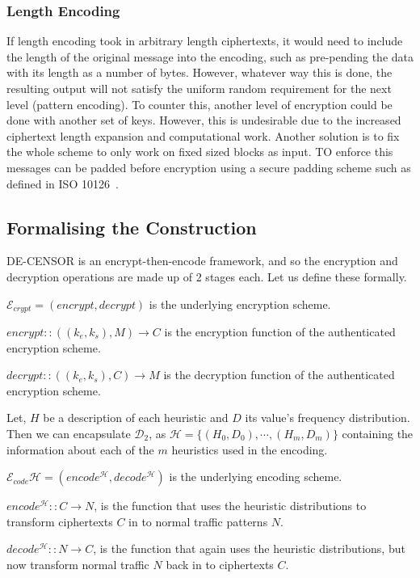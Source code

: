\documentclass[ %
                    author={Samuel Russell},
                supervisor={Prof. Bogdan Warinschi},
                    degree={MEng},
                     title={Innocuous Ciphertexts},
                  subtitle={The DE-CENSOR Scheme},
                      type={Research},
                      year={2018} ]{dissertation}
\begin{document}
\subsubsection{Length Encoding}

If length encoding took in arbitrary length ciphertexts, it would need to include the length of the original message into the encoding, such as pre-pending the data with its length as a number of bytes.
However, whatever way this is done, the resulting output will not satisfy the uniform random requirement for the next level (pattern encoding).
To counter this, another level of encryption could be done with another set of keys. However, this is undesirable due to the increased ciphertext length expansion and computational work.
Another solution is to fix the whole scheme to only work on fixed sized blocks as input. TO enforce this messages can be padded before encryption using a secure padding scheme such as defined in ISO 10126~\cite{iso-pad}.


\subsection{Formalising the Construction}

DE-CENSOR is an encrypt-then-encode framework, and so the encryption and decryption operations are made up of 2 stages each. Let us define these formally.

$\mathcal{E}_{crypt} = (encrypt, decrypt) $ is the underlying encryption scheme.

$encrypt :: ( (k_e, k_s), M ) \rightarrow C$ is the encryption function of the authenticated encryption scheme.

$decrypt :: ( (k_e, k_s), C ) \rightarrow M$ is the decryption function of the authenticated encryption scheme.

Let, $H$ be a description of each heuristic and $D$ its value's frequency distribution.
Then we can encapsulate $\mathcal{D}_2$, as $\mathcal{H} = \{(H_0,D_0), \cdots , (H_m,D_m)\}$ containing the information about each of the $m$ heuristics used in the encoding.

$\mathcal{E}_{code}{\mathcal{H}} = (encode^{\mathcal{H}}, decode^{\mathcal{H}}) $ is the underlying encoding scheme.

$encode^{\mathcal{H}} :: C \rightarrow N$, is the function that uses the heuristic distributions to transform ciphertexts $C$ in to normal traffic patterns $N$.

$decode^{\mathcal{H}} :: N \rightarrow C$, is the function that again uses the heuristic distributions, but now transform normal traffic $N$ back in to ciphertexts $C$.
\end{document}
